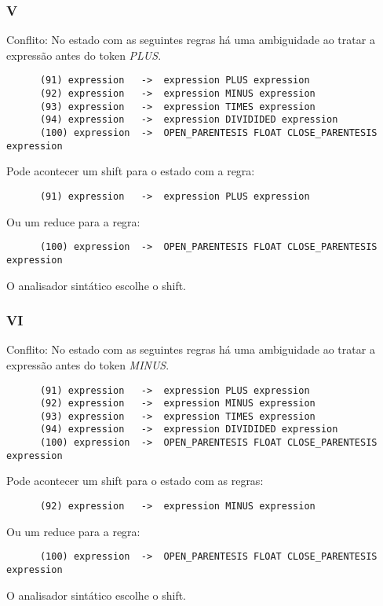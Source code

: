 \documentclass[a4paper,10pt]{article}
\begin{document}
    \subsubsection{V}
      Conflito: No estado com as seguintes regras h\'a uma ambiguidade ao tratar a express\~ao antes do token \emph{PLUS}.
      \begin{lstlisting}
      (91) expression	->	expression PLUS expression
      (92) expression	->	expression MINUS expression
      (93) expression	->	expression TIMES expression
      (94) expression	->	expression DIVIDIDED expression
      (100) expression	->	OPEN_PARENTESIS FLOAT CLOSE_PARENTESIS expression
      \end{lstlisting}
      Pode acontecer um shift para o estado com a regra:
      \begin{lstlisting}
      (91) expression	->	expression PLUS expression
      \end{lstlisting}
      Ou um reduce para a regra:
      \begin{lstlisting}
      (100) expression	->	OPEN_PARENTESIS FLOAT CLOSE_PARENTESIS expression
      \end{lstlisting}
      O analisador sint\'atico escolhe o shift.
      \vspace{5mm}
      
    \subsubsection{VI}
      Conflito: No estado com as seguintes regras h\'a uma ambiguidade ao tratar a express\~ao antes do token \emph{MINUS}.
      \begin{lstlisting}
      (91) expression	->	expression PLUS expression
      (92) expression	->	expression MINUS expression
      (93) expression	->	expression TIMES expression
      (94) expression	->	expression DIVIDIDED expression
      (100) expression	->	OPEN_PARENTESIS FLOAT CLOSE_PARENTESIS expression
      \end{lstlisting}
      Pode acontecer um shift para o estado com as regras:
      \begin{lstlisting}
      (92) expression	->	expression MINUS expression
      \end{lstlisting}
      Ou um reduce para a regra:
      \begin{lstlisting}
      (100) expression	->	OPEN_PARENTESIS FLOAT CLOSE_PARENTESIS expression
      \end{lstlisting}
      O analisador sint\'atico escolhe o shift.
      \vspace{5mm}
\end{document}

